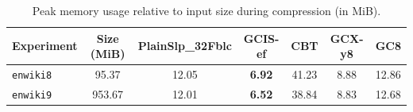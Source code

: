 \begin{table}[t]
\caption{Peak memory usage relative to input size during compression (in MiB). }
\label{t:memory-usage}
\centering
\setlength{\tabcolsep}{5pt}
\begin{tabular}{|l|c|c|c|c|c|c|}
\hline
Experiment & Size (MiB) & PlainSlp_32Fblc & GCIS-ef & CBT & GCX-y8 & GC8 \\
\hline
\texttt{enwiki8} & 95.37 & 12.05 & \textbf{6.92} & 41.23 & 8.88 & 12.86 \\
\texttt{enwiki9} & 953.67 & 12.01 & \textbf{6.52} & 38.84 & 8.83 & 12.68 \\
\hline
\end{tabular}
\end{table}